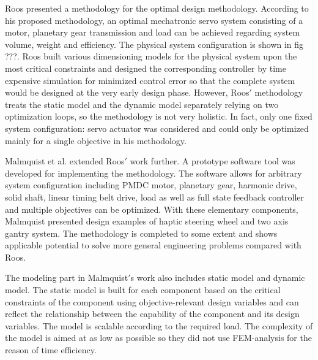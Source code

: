 Roos presented a methodology for the optimal design methodology\cite{roos2007}. According to his proposed methodology, an optimal mechatronic servo system consisting of a motor, planetary gear transmission and load can be achieved regarding system volume, weight and efficiency. The physical system configuration is shown in fig ???. Roos built various dimensioning models for the physical system upon the most critical constraints and designed the corresponding controller by time expensive simulation for minimized control error so that the complete system would be designed at the very early design phase. However, Roos$'$ methodology treats the static model and the dynamic model separately relying on two optimization loops, so the methodology is not very holistic. In fact, only one fixed system configuration: servo actuator was considered and could only be optimized mainly for a single objective in his methodology.

Malmquist et al. extended Roos$'$ work further. A prototype software tool was developed for implementing the methodology. The software allows for arbitrary system configuration including PMDC motor, planetary gear, harmonic drive, solid shaft, linear timing belt drive, load as well as full state feedback controller and multiple objectives can be optimized. With these elementary components, Malmquist presented design examples of haptic steering wheel and two axis gantry system. The methodology is completed to some extent and shows applicable potential to solve more general engineering problems compared with Roos.

The modeling part in Malmquist$'$s work also includes static model and dynamic model. The static model is built for each component based on the critical constraints of the component using objective-relevant design variables and can reflect the relationship between the capability of the component and its design variables. The model is scalable according to the required load. The complexity of the model is aimed at as low as possible so they did not use FEM-analysis for the reason of time efficiency.

